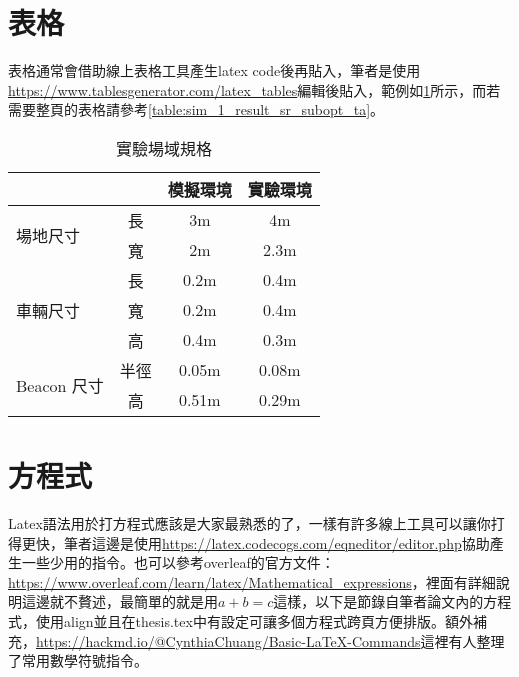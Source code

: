 
\section{表格}
\label{sec:table}

表格通常會借助線上表格工具產生latex code後再貼入，筆者是使用\url{https://www.tablesgenerator.com/latex_tables}編輯後貼入，範例如\cref{table:exp_size}所示，而若需要整頁的表格請參考\cref{table:sim_1_result_sr_subopt_ta}。

\begin{table}[htbp]
\caption{實驗場域規格}
\label{table:exp_size}
\setlength{\tabcolsep}{7mm}
\begin{tabular}{lccc}
\hline
                           &    & 模擬環境  & 實驗環境  \\ \hline
\multirow{2}{*}{場地尺寸}      & 長  & 3m    & 4m    \\
                           & 寬  & 2m    & 2.3m  \\ \hline
\multirow{3}{*}{車輛尺寸}      & 長  & 0.2m  & 0.4m  \\
                           & 寬  & 0.2m  & 0.4m  \\
                           & 高  & 0.4m  & 0.3m  \\ \hline
\multirow{2}{*}{Beacon 尺寸} & 半徑 & 0.05m & 0.08m \\
                           & 高  & 0.51m & 0.29m \\ \hline
\end{tabular}
\end{table}

\section{方程式}
\label{sec:equation}

Latex語法用於打方程式應該是大家最熟悉的了，一樣有許多線上工具可以讓你打得更快，筆者這邊是使用\url{https://latex.codecogs.com/eqneditor/editor.php}協助產生一些少用的指令。也可以參考overleaf的官方文件：\url{https://www.overleaf.com/learn/latex/Mathematical_expressions}，裡面有詳細說明這邊就不贅述，最簡單的就是用$a+b=c$這樣，以下是節錄自筆者論文內的方程式，使用align並且在thesis.tex中有設定可讓多個方程式跨頁方便排版。額外補充，\url{https://hackmd.io/@CynthiaChuang/Basic-LaTeX-Commands}這裡有人整理了常用數學符號指令。

